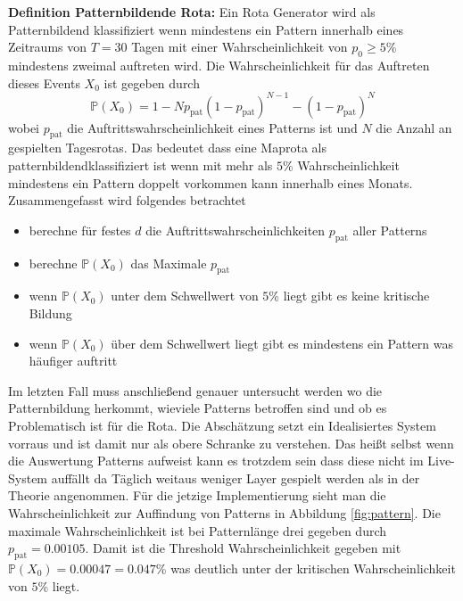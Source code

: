         \textbf{Definition Patternbildende Rota:}
        Ein Rota Generator wird als \glqq Patternbildend \grqq klassifiziert wenn mindestens ein Pattern innerhalb eines Zeitraums 
        von $T = 30$ Tagen mit einer Wahrscheinlichkeit von $p_0 \geq 5$\% mindestens zweimal auftreten wird. 
        Die Wahrscheinlichkeit für das Auftreten dieses Events $ X_0 $ ist gegeben durch
        \begin{equation}
            \mathbb{P}(X_0) = 1-N p_\text{pat}(1-p_\text{pat})^{N-1}-(1-p_\text{pat})^N
        \end{equation}
        wobei $p_\text{pat}$ die Auftrittswahrscheinlichkeit eines Patterns ist und $N$ die Anzahl an
        gespielten Tagesrotas. Das bedeutet dass eine Maprota als \glqq patternbildend\grqq klassifiziert
        ist wenn mit mehr als $5$\% Wahrscheinlichkeit mindestens ein Pattern doppelt vorkommen
        kann innerhalb eines Monats.
        Zusammengefasst wird folgendes betrachtet 
        \begin{itemize}
            \item berechne für festes $d$ die Auftrittswahrscheinlichkeiten $p_\text{pat}$ aller Patterns
            \item berechne $\mathbb{P}(X_0)$ das Maximale $p_\text{pat}$ 
            \item wenn $\mathbb{P}(X_0)$ unter dem Schwellwert von $5$\% liegt gibt es keine kritische Bildung
            \item wenn $\mathbb{P}(X_0)$ über dem Schwellwert liegt gibt es mindestens ein Pattern was häufiger auftritt
        \end{itemize}
        Im letzten Fall muss anschließend genauer untersucht werden wo die Patternbildung herkommt, wieviele Patterns betroffen sind und ob es Problematisch ist für die Rota. 
        Die Abschätzung setzt ein Idealisiertes System vorraus und ist damit nur als obere Schranke zu verstehen. 
        Das heißt selbst wenn die Auswertung Patterns aufweist kann es trotzdem sein dass diese nicht im Live-System auffällt da Täglich weitaus weniger Layer gespielt werden als in der Theorie angenommen.
        Für die jetzige Implementierung sieht man die Wahrscheinlichkeit zur Auffindung von Patterns in Abbildung \ref{fig:pattern}. 
        Die maximale Wahrscheinlichkeit ist bei Patternlänge drei gegeben durch $p_\text{pat}=0.00105$. 
        Damit ist die Threshold Wahrscheinlichkeit gegeben mit $\mathbb{P}(X_0) = 0.00047=0.047$\% was deutlich unter der kritischen Wahrscheinlichkeit von $5$\% liegt.

